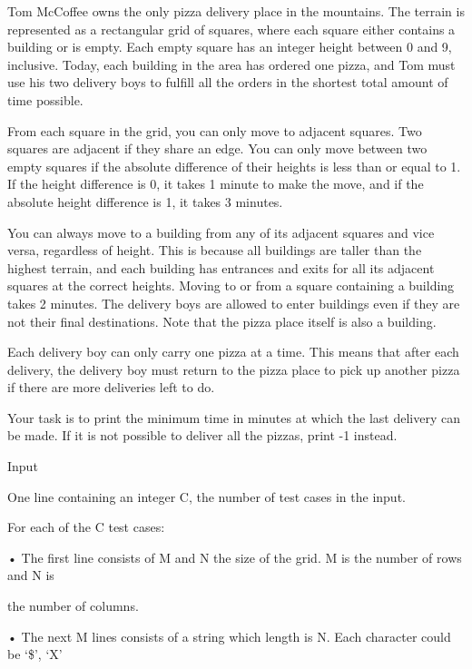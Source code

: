 



   Tom McCoffee owns the only pizza delivery place in the mountains. The terrain is represented as a rectangular grid of squares, where each square either contains a building or is empty. Each empty square has an integer height between 0 and 9, inclusive. Today, each building in the area has ordered one pizza, and Tom must use his two delivery boys to fulfill all the orders in the shortest total amount of time possible.  




   From each square in the grid, you can only move to adjacent squares. Two squares are adjacent if they share an edge. You can only move between two empty squares if the absolute difference of their heights is less than or equal to 1. If the height difference is 0, it takes 1 minute to make the move, and if the absolute height difference is 1, it takes 3 minutes.  

   You can always move to a building from any of its adjacent squares and vice versa, regardless of height. This is because all buildings are taller than the highest terrain, and each building has entrances and exits for all its adjacent squares at the correct heights. Moving to or from a square containing a building takes 2 minutes. The delivery boys are allowed to enter buildings even if they are not their final destinations. Note that the pizza place itself is also a building.  




   Each delivery boy can only carry one pizza at a time. This means that after each delivery, the delivery boy must return to the pizza place to pick up another pizza if there are more deliveries left to do.  




   Your task is to print the minimum time in minutes at which the last delivery can be made. If it is not possible to deliver all the pizzas, print -1 instead.  




   Input   


   One line containing an integer C, the number of test cases in the input.   


   For each of the C test cases:   


   • The first line consists of M and N the size of the grid. M is the number of rows and N is   


   the number of columns.   


   • The next M lines consists of a string which length is N. Each character could be ‘\$’, ‘X’   


